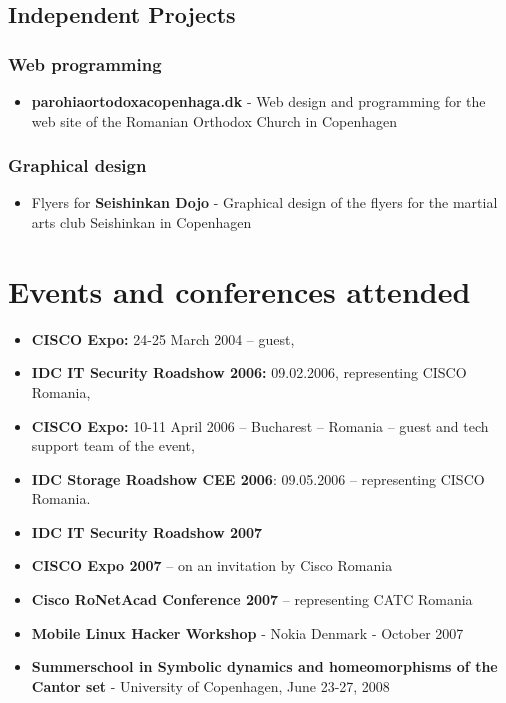 \subsection{Independent Projects}
        \subsubsection{Web programming}
        \begin{itemize}
            \item \textbf{parohiaortodoxacopenhaga.dk} - Web design and programming for the web site of the Romanian Orthodox Church in Copenhagen 
        \end{itemize}

        \subsubsection{Graphical design}
        \begin{itemize}
            \item Flyers for \textbf{Seishinkan Dojo} - Graphical design of the flyers for the martial arts club Seishinkan in Copenhagen
        \end{itemize}
        
        
        
\section{Events and conferences attended}
    \begin{itemize}
        \item \textbf{CISCO Expo:}  24-25 March 2004 – guest,
        \item \textbf{IDC IT Security Roadshow 2006:} 09.02.2006, representing CISCO Romania,
        \item \textbf{CISCO Expo:} 10-11 April 2006 – Bucharest – Romania – guest and tech support team of the event,
        \item \textbf{IDC Storage Roadshow CEE 2006}: 09.05.2006 – representing CISCO Romania. 
        \item \textbf{IDC IT Security Roadshow 2007} 
        \item \textbf{CISCO Expo 2007} – on an invitation by Cisco Romania
        \item \textbf{Cisco RoNetAcad Conference 2007} – representing CATC Romania
        \item \textbf{Mobile Linux Hacker Workshop} - Nokia Denmark - October 2007
        \item \textbf{Summerschool in Symbolic dynamics and homeomorphisms of the Cantor set} - University of Copenhagen, June 23-27, 2008  
    \end{itemize}